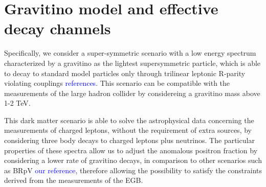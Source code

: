 \documentclass[a4paper,11pt]{article}
\newcommand*{\blue}{\textcolor{blue}}
\begin{document}

 
\section{Gravitino model and effective decay channels}
\label{gdecay}

Specifically, we consider a super-symmetric scenario with a low energy spectrum characterized by a gravitino as the lightest supersymmetric particle, which is able to decay to standard model particles only through trilinear leptonic R-parity violating couplings \blue{references}. This scenario can be compatible with the measurements of the large hadron collider by considereing a gravitino mass above 1-2 TeV. 

This dark matter scenario is able to solve the astrophysical data concerning the measurements of charged leptons, without the requirement of extra sources, by considering three body decays to charged leptons plus neutrinos. The particular properties of these spectra allow us to adjust the anomalous positron fraction by considering a lower rate of gravitino decays, in comparison to other scenarios such as BRpV \blue{our reference}, therefore allowing the possibility to satisfy the constraints derived from the measurements of the EGB.

\end{document}
